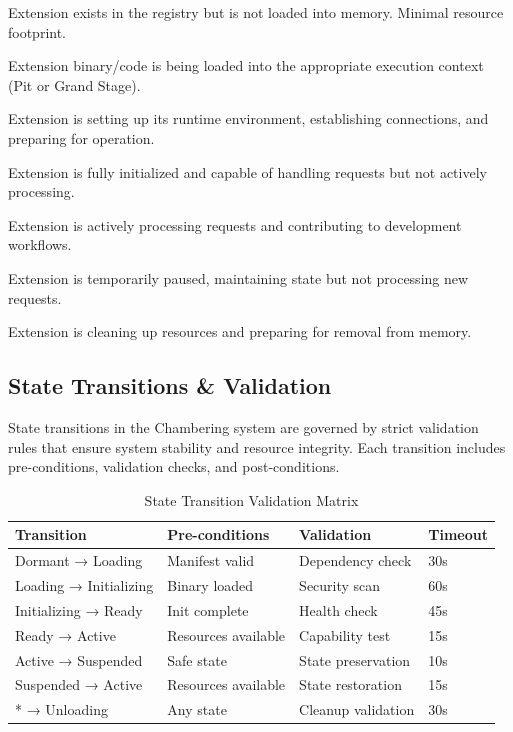 \begin{description}[leftmargin=3cm,labelwidth=2.5cm]
\item[\textbf{Dormant}] Extension exists in the registry but is not loaded into memory. Minimal resource footprint.

\item[\textbf{Loading}] Extension binary/code is being loaded into the appropriate execution context (Pit or Grand Stage).

\item[\textbf{Initializing}] Extension is setting up its runtime environment, establishing connections, and preparing for operation.

\item[\textbf{Ready}] Extension is fully initialized and capable of handling requests but not actively processing.

\item[\textbf{Active}] Extension is actively processing requests and contributing to development workflows.

\item[\textbf{Suspended}] Extension is temporarily paused, maintaining state but not processing new requests.

\item[\textbf{Unloading}] Extension is cleaning up resources and preparing for removal from memory.
\end{description}

\subsection{State Transitions \& Validation}
\label{subsec:state-transitions-validation}

State transitions in the Chambering system are governed by strict validation rules that ensure system stability and resource integrity. Each transition includes pre-conditions, validation checks, and post-conditions.

\begin{table}[h]
\centering
\caption{State Transition Validation Matrix}
\label{tab:state-transition-validation}
\begin{tabular}{@{}llll@{}}
\toprule
\textbf{Transition} & \textbf{Pre-conditions} & \textbf{Validation} & \textbf{Timeout} \\
\midrule
Dormant → Loading & Manifest valid & Dependency check & 30s \\
Loading → Initializing & Binary loaded & Security scan & 60s \\
Initializing → Ready & Init complete & Health check & 45s \\
Ready → Active & Resources available & Capability test & 15s \\
Active → Suspended & Safe state & State preservation & 10s \\
Suspended → Active & Resources available & State restoration & 15s \\
* → Unloading & Any state & Cleanup validation & 30s \\
\bottomrule
\end{tabular}
\end{table}

